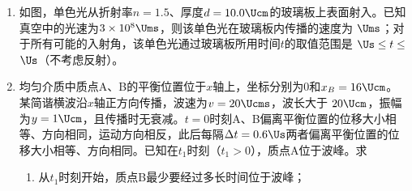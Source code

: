 \documentclass[\gkver]{gaokaozhenti}
\begin{document}
\begin{enumerate}
{$V_{A}'+V_{B}'=2V$，$p_{A}'=p_{B}'-0.5p_{0}$

联立解得

$p_{B}'=\frac{3-\sqrt{5}}{4}p_{0}$（舍去），$p_{B}'=\frac{3+\sqrt{5}}{4}p_{0}$

$V_{A}'=(\sqrt{5}-1)V$
}

\item
如图，单色光从折射率$n=1.5$、厚度$d=10.0\Ucm$的玻璃板上表面射入。已知真空中的光速为$3\times10^{8}\Ums$，则该单色光在玻璃板内传播的速度为 $\Ums$；对于所有可能的入射角，该单色光通过玻璃板所用时间$t$的取值范围是 $\Us\leq t\leq$ $\Us$（不考虑反射）。



\item
均匀介质中质点A、B的平衡位置位于$x$轴上，坐标分别为0和$x_{B}=16\Ucm$。某简谐横波沿$x$轴正方向传播，波速为$v=20\Ucms$，波长大于 $20\Ucm$，振幅为$y=1\Ucm$，且传播时无衰减。$t=0$时刻A、B偏离平衡位置的位移大小相等、方向相同，运动方向相反，此后每隔$\Delta t=0.6\Us$两者偏离平衡位置的位移大小相等、方向相同。已知在$t_{1}$时刻（$t_{1}>0$），质点A位于波峰。求

\begin{enumerate}
	\item
	从$t_{1}$时刻开始，质点B最少要经过多长时间位于波峰；


\end{enumerate}
\end{enumerate}
\end{document}
